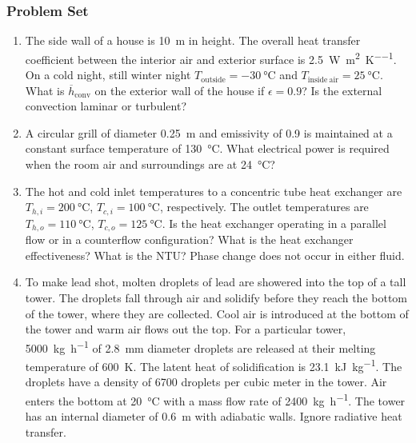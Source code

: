 \documentclass[12pt,letterpaper]{article}
\begin{document}
\subsubsection*{Problem Set}
\begin{enumerate}
    \item The side wall of a house is \SI{10}{\meter} in height.
        The overall heat transfer coefficient between the interior air and exterior surface is \SI{2.5}{\watt\per\square\meter\per\kelvin}.
        On a cold night, still winter night $T_{\mathrm{outside}} = - \SI{30}{\celsius}$ and $T_{\mathrm{inside~air}} = \SI{25}{\celsius}$.
        What is $\overline{h}_{\mathrm{conv}}$ on the exterior wall of the house if $\epsilon = 0.9$?
        Is the external convection laminar or turbulent?
    
    \item A circular grill of diameter \SI{0.25}{\meter} and emissivity of 0.9 is maintained at a constant surface temperature of \SI{130}{\celsius}.
        What electrical power is required when the room air and surroundings are at \SI{24}{\celsius}?
    
    \item The hot and cold inlet temperatures to a concentric tube heat exchanger are $T_{h,i} = \SI{200}{\celsius}$, $T_{c,i} = \SI{100}{\celsius}$, respectively.
        The outlet temperatures are $T_{h,o} = \SI{110}{\celsius}$, $T_{c,o} = \SI{125}{\celsius}$.
        Is the heat exchanger operating in a parallel flow or in a counterflow configuration?
        What is the heat exchanger effectiveness?
        What is the NTU?
        Phase change does not occur in either fluid.

    \item To make lead shot, molten droplets of lead are showered into the top of a tall tower.
        The droplets fall through air and solidify before they reach the bottom of the tower, where they are collected.
        Cool air is introduced at the bottom of the tower and warm air flows out the top.
        For a particular tower, \SI{5000}{\kilogram\per\hour} of \SI{2.8}{\milli\meter} diameter droplets are released at their melting temperature of \SI{600}{\kelvin}.
        The latent heat of solidification is \SI{23.1}{\kilo\joule\per\kilogram}.
        The droplets have a density of \num{6700} droplets per cubic meter in the tower.
        Air enters the bottom at \SI{20}{\celsius} with a mass flow rate of \SI{2400}{\kilogram\per\hour}.
        The tower has an internal diameter of \SI{0.6}{\meter} with adiabatic walls.
        Ignore radiative heat transfer.


\end{enumerate}
\end{document}
